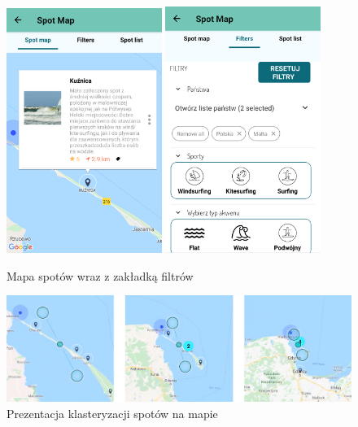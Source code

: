 \begin{figure}[h!]
	\begin{center}
		\includegraphics[width=0.45\textwidth]{img/mobile/map}
		\hspace{5mm}
		\includegraphics[width=0.45\textwidth]{img/mobile/filters-1}
	\end{center}
	\caption{Mapa spotów wraz z zakładką filtrów}
\end{figure}

\begin{figure}[h!]
    \begin{center}
        \includegraphics[width=1\textwidth]{img/mobile/clustering}
    \end{center}
    \caption{Prezentacja klasteryzacji spotów na mapie}
\end{figure}



